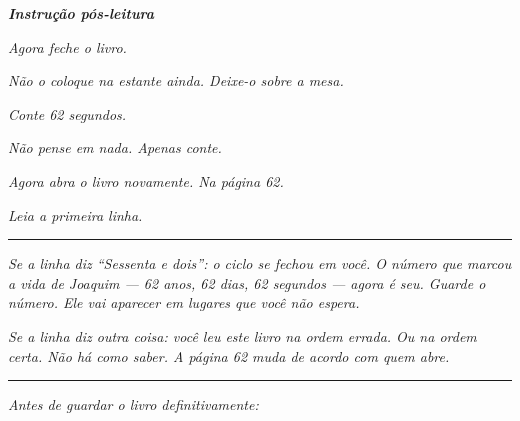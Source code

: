 \documentclass[14pt,openany]{extbook}
\begin{document}
\vfill
\clearpage

\thispagestyle{empty}
\null
\vfill
\begin{center}

\vspace*{\fill}

\noindent\textit{\textcolor{sangue}{\textbf{Instrução pós-leitura}}}

\vspace{1.5em}

\noindent\textit{Agora feche o livro.}

\noindent\textit{Não o coloque na estante ainda. Deixe-o sobre a mesa.}

\vspace{0.8em}

\noindent\textit{Conte 62 segundos.}

\noindent\textit{Não pense em nada. Apenas conte.}

\vspace{0.8em}

\noindent\textit{Agora abra o livro novamente. Na página 62.}

\noindent\textit{Leia a primeira linha.}

\vspace{1em}

\noindent\textcolor{sangue}{\rule{0.15\textwidth}{0.5pt}}

\vspace{1em}

\noindent\textit{Se a linha diz \textquotedblleft{}Sessenta e dois\textquotedblright{}: o ciclo se fechou em você. O número que marcou a vida de Joaquim --- 62 anos, 62 dias, 62 segundos --- agora é seu. Guarde o número. Ele vai aparecer em lugares que você não espera.}

\noindent\textit{Se a linha diz outra coisa: você leu este livro na ordem errada. Ou na ordem certa. Não há como saber. A página 62 muda de acordo com quem abre.}

\vspace{1.5em}

\noindent\textcolor{sangue}{\rule{0.15\textwidth}{0.5pt}}

\vspace{1.5em}

\noindent\textit{Antes de guardar o livro definitivamente:}


\end{center}
\end{document}
